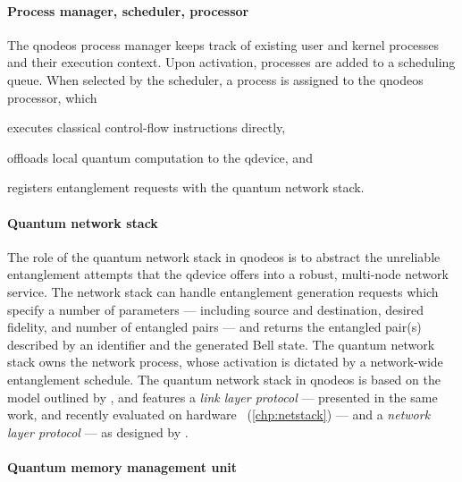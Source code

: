 \paragraph{Process manager, scheduler, processor}

The \acrshort{qnodeos} process manager keeps track of existing user and kernel processes and their
execution context. Upon activation, processes are added to a scheduling queue. When selected by the
scheduler, a process is assigned to the \acrshort{qnodeos} processor, which
%
\begin{inlinelist}
    \item executes classical control-flow instructions directly,
    \item offloads local quantum computation to the \acrshort{qdevice}, and
    \item registers entanglement requests with the quantum network stack.
\end{inlinelist}

\paragraph{Quantum network stack}

The role of the quantum network stack in \acrshort{qnodeos} is to abstract the unreliable
entanglement attempts that the \acrshort{qdevice} offers into a robust, multi-node network service.
The network stack can handle entanglement generation requests which specify a number of parameters
--- including source and destination, desired fidelity, and number of entangled pairs --- and
returns the entangled pair(s) described by an identifier and the generated Bell state. The quantum
network stack owns the network process, whose activation is dictated by a network-wide entanglement
schedule. The quantum network stack in \acrshort{qnodeos} is based on the model outlined by
\textcite{dahlberg_2019_egp}, and features a \emph{link layer protocol} --- presented in the same
work, and recently evaluated on hardware~\cite{pompili_2022_experimental} (\cref{chp:netstack}) ---
and a \emph{network layer protocol} --- as designed by \textcite{kozlowski_2020_qnp}.

\paragraph{Quantum memory management unit}

